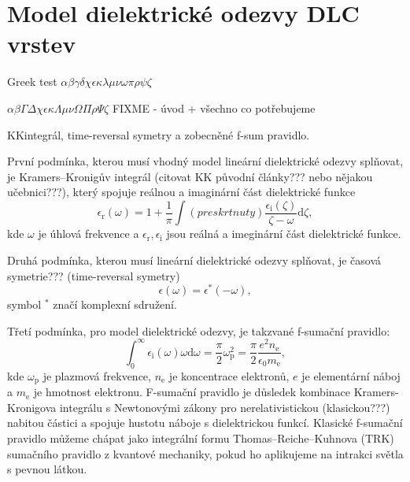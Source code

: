 \chapter{Model dielektrické odezvy DLC vrstev}
Greek test
$\alpha \beta \gamma \delta \chi \epsilon \kappa \lambda \mu \nu \omega \pi \rho \psi \zeta$

$\alpha \beta \Gamma \Delta \chi \epsilon \kappa \Lambda \mu \nu \Omega \Pi \rho \Psi \zeta$
FIXME - úvod + všechno co potřebujeme 

KKintegrál, time-reversal symetry a zobecněné f-sum pravidlo.

První podmínka, kterou musí vhodný model lineární dielektrické odezvy splňovat, je Kramers--Kronigův integrál (citovat KK původní články??? nebo nějakou učebnici???), který spojuje reálnou a imaginární část dielektrické funkce  
\begin{equation}
\epsilon_\mathrm{r}(\omega) = 1 + \frac{1}{\pi} \int (preskrtnuty) \frac{\epsilon_\mathrm{i}(\zeta)}{\zeta - \omega} \mathrm{d}\zeta \mathrm{,}
\label{KKint}
\end{equation}
kde $\omega$ je úhlová frekvence a $\epsilon_\mathrm{r}, \epsilon_\mathrm{i}$ jsou reálná a imeginární část dielektrické funkce.  

Druhá podmínka, kterou musí lineární dielektrické odezvy splňovat, je časová symetrie??? (time-reversal symetry)
\begin{equation}
\epsilon(\omega) =\epsilon^* (-\omega) \mathrm{,}
\label{casovasymetrie}
\end{equation}
symbol $^*$ značí komplexní sdružení.

Třetí podmínka, pro model dielektrické odezvy, je takzvané f-sumační pravidlo:
\begin{equation}
\int_0^\infty \epsilon_\mathrm{i} (\omega) \omega \mathrm{d} \omega = \frac{\pi}{2} \omega_\mathrm{p}^2 = \frac{\pi}{2} \frac{e^2 n_\mathrm{e}}{ \epsilon_0 m_\mathrm{e}} \mathrm{,}
\end{equation}
kde $\omega_\mathrm{p}$ je plazmová frekvence, $n_\mathrm{e}$ je koncentrace elektronů, $e$ je elementární náboj a $m_\mathrm{e}$ je hmotnost elektronu. F-sumační pravidlo je důsledek kombinace Kramers-Kronigova integrálu s Newtonovými zákony pro nerelativistickou (klasickou???) nabitou částici a spojuje hustotu náboje s dielektrickou funkcí. Klasické f-sumační pravidlo můžeme chápat jako integrální formu Thomas--Reiche--Kuhnova (TRK) sumačního pravidlo z kvantové mechaniky, pokud ho aplikujeme na intrakci světla s pevnou látkou.  

